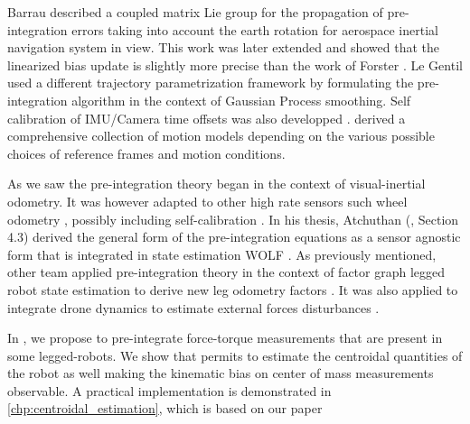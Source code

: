 Barrau \cite{barrau2020mathematical} described a coupled matrix Lie group for the propagation of pre-integration errors taking into account the earth rotation for aerospace
inertial navigation system in view. This work was later extended \cite{brossard2021associating} and showed that the linearized bias update is slightly more precise than 
the work of Forster \cite{forster2017-TRO}. Le Gentil \cite{le2020gaussian} used a different trajectory parametrization framework by formulating the pre-integration algorithm 
in the context of Gaussian Process smoothing. Self calibration of IMU/Camera time offsets was also developped \cite{yang2020analytic}. 
\cite{luo2021unified} derived a comprehensive collection of motion models depending on the various possible choices of reference frames and motion conditions. 

As we saw the pre-integration theory began in the context of visual-inertial odometry. It was however adapted to other high rate sensors such wheel odometry \cite{quan2019tightly}, 
possibly including self-calibration \cite{deray-19-selfcalib}. In his thesis, Atchuthan (\cite{atchuthan-18-thesis}, Section 4.3) derived the general form of the pre-integration 
equations as a sensor agnostic form that is integrated in state estimation WOLF \cite{sola2021wolf}. As previously mentioned, other team applied pre-integration theory in the 
context of factor graph legged robot state estimation to derive new leg odometry factors \cite{hartley2018legged, wisth2019robust, wisth2020pre-integrated}.
It was also applied to integrate drone dynamics to estimate external forces disturbances \cite{nisar2019vimo}.

In , we propose to pre-integrate force-torque measurements that are present in some legged-robots. We show that permits to estimate the centroidal quantities of the robot as well making the kinematic bias on center of mass measurements observable. A practical implementation is demonstrated in \ref{chp:centroidal_estimation}, which is based on our paper \cite{fourmy2021contact}

